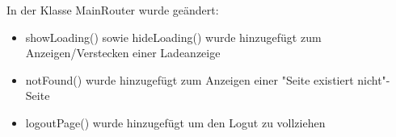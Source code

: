 In der Klasse MainRouter wurde geändert:
\begin{itemize}
	\item showLoading() sowie hideLoading() wurde hinzugefügt zum Anzeigen/Verstecken einer Ladeanzeige
	\item notFound() wurde hinzugefügt zum Anzeigen einer "Seite existiert nicht"-Seite
	\item logoutPage() wurde hinzugefügt um den Logut zu vollziehen
\end{itemize}